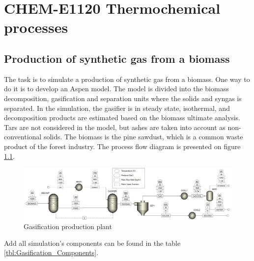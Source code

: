 \chapter{CHEM-E1120 Thermochemical processes}

\section{Production of synthetic gas from a biomass}

The task is to simulate a production of synthetic gas from a biomass. One way to do it is to develop an Aspen model. The model is divided into the biomass decomposition, gasification and separation units where the solids and syngas is separated. In the simulation, the gasifier is in steady state, isothermal, and decomposition products are estimated based on the biomass ultimate analysis. Tars are not considered in the model, but ashes are taken into account as non-conventional solids. The biomass is the pine sawdust, which is a common waste product of the forest industry. The process flow diagram is presented on figure \ref{fig:Gasification}.

\begin{figure}[h!]
	\centering
	\includegraphics[width=\linewidth]{Figures/TchermochemicalProcesses/Gasification.jpeg}
	\caption{Gasification production plant}
	\label{fig:Gasification}
\end{figure}

Add all simulation's components can be found in the table \ref{tbl:Gasification_Components}.


